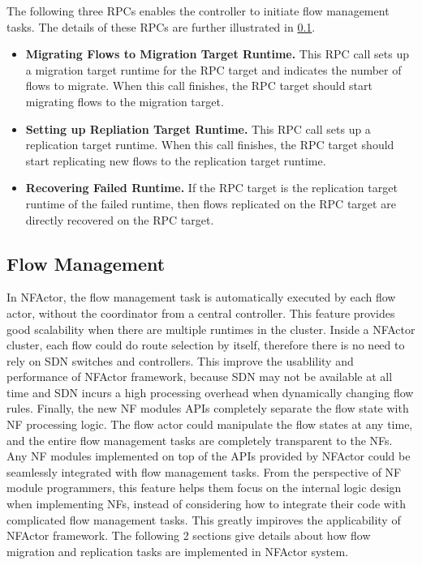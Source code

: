 The following three RPCs enables the controller to initiate flow management tasks. The details of these RPCs are further illustrated in \ref{}.

\begin{itemize}

\item \textbf{Migrating Flows to Migration Target Runtime.} This RPC call sets up a migration target runtime for the RPC target and indicates the number of flows to migrate. When this call finishes, the RPC target should start migrating flows to the migration target.


\item \textbf{Setting up Repliation Target Runtime.} This RPC call sets up a replication target runtime. When this call finishes, the RPC target should start replicating new flows to the replication target runtime.

\item \textbf{Recovering Failed Runtime.} If the RPC target is the replication target runtime of the failed runtime, then flows replicated on the RPC target are directly recovered on the RPC target.

\end{itemize}

\subsection{Flow Management}

In NFActor, the flow management task is automatically executed by each flow actor, without the coordinator from a central controller. This feature provides good scalability when there are multiple runtimes in the cluster. Inside a NFActor cluster, each flow could do route selection by itself, therefore there is no need to rely on SDN switches and controllers. This improve the usablility and performance of NFActor framework, because SDN may not be available at all time and SDN incurs a high processing overhead when dynamically changing flow rules. Finally, the new NF modules APIs completely separate the flow state with NF processing logic. The flow actor could manipulate the flow states at any time, and the entire flow management tasks are completely transparent to the NFs. Any NF modules implemented on top of the APIs provided by NFActor could be seamlessly integrated with flow management tasks. From the perspective of NF module programmers, this feature helps them focus on the internal logic design when implementing NFs, instead of considering how to integrate their code with complicated flow management tasks. This greatly impiroves the applicability of NFActor framework. The following 2 sections give details about how flow migration and replication tasks are implemented in NFActor system.

